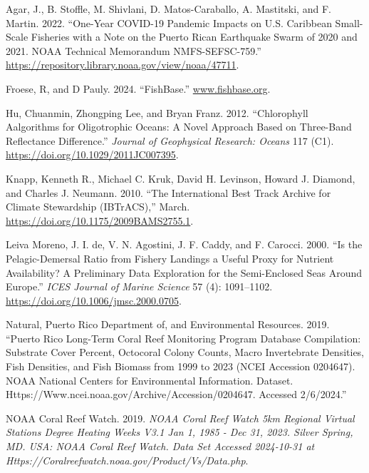 \documentclass[
  letterpaper,
  oneside,
  open=any]{scrbook}
\newlength{\cslhangindent}
\newenvironment{CSLReferences}[2] %
 {\begin{list}{}{%
  \setlength{\itemindent}{0pt}
  \setlength{\leftmargin}{0pt}
  \setlength{\parsep}{0pt}
  \ifodd #1
   \setlength{\leftmargin}{\cslhangindent}
   \setlength{\itemindent}{-1\cslhangindent}
  \fi
  \setlength{\itemsep}{#2\baselineskip}}}
 {\end{list}}
\begin{document}
\label{refs}
\begin{CSLReferences}{1}{0}
Agar, J., B. Stoffle, M. Shivlani, D. Matos-Caraballo, A. Mastitski, and
F. Martin. 2022. {``One-Year COVID-19 Pandemic Impacts on U.S. Caribbean
Small-Scale Fisheries with a Note on the Puerto Rican Earthquake Swarm
of 2020 and 2021. NOAA Technical Memorandum NMFS-SEFSC-759.''}
\url{https://repository.library.noaa.gov/view/noaa/47711}.

Froese, R, and D Pauly. 2024. {``FishBase.''}
\href{https://www.fishbase.org}{www.fishbase.org}.

Hu, Chuanmin, Zhongping Lee, and Bryan Franz. 2012. {``Chlorophyll
Aalgorithms for Oligotrophic Oceans: A Novel Approach Based on
Three-Band Reflectance Difference.''} \emph{Journal of Geophysical
Research: Oceans} 117 (C1). \url{https://doi.org/10.1029/2011JC007395}.

Knapp, Kenneth R., Michael C. Kruk, David H. Levinson, Howard J.
Diamond, and Charles J. Neumann. 2010. {``The International Best Track
Archive for Climate Stewardship (IBTrACS),''} March.
\url{https://doi.org/10.1175/2009BAMS2755.1}.

Leiva Moreno, J. I. de, V. N. Agostini, J. F. Caddy, and F. Carocci.
2000. {``Is the Pelagic-Demersal Ratio from Fishery Landings a Useful
Proxy for Nutrient Availability? A Preliminary Data Exploration for the
Semi-Enclosed Seas Around Europe.''} \emph{ICES Journal of Marine
Science} 57 (4): 1091--1102.
\url{https://doi.org/10.1006/jmsc.2000.0705}.

Natural, Puerto Rico Department of, and Environmental Resources. 2019.
{``Puerto Rico Long-Term Coral Reef Monitoring Program Database
Compilation: Substrate Cover Percent, Octocoral Colony Counts, Macro
Invertebrate Densities, Fish Densities, and Fish Biomass from 1999 to
2023 (NCEI Accession 0204647). NOAA National Centers for Environmental
Information. Dataset.
Https://Www.ncei.noaa.gov/Archive/Accession/0204647. Accessed
2/6/2024.''}

NOAA Coral Reef Watch. 2019. \emph{NOAA Coral Reef Watch 5km Regional
Virtual Stations Degree Heating Weeks V3.1 Jan 1, 1985 - Dec 31, 2023.
Silver Spring, MD. USA: NOAA Coral Reef Watch. Data Set Accessed
2024-10-31 at Https://Coralreefwatch.noaa.gov/Product/Vs/Data.php}.


\end{CSLReferences}
\end{document}
